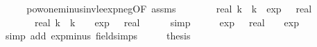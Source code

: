 \begin{isabellebody}
%
\isadelimproof
%
\endisadelimproof
%
\isatagproof
{}\isamarkupfalse%
\ {\isacharminus}{\kern0pt}\isanewline
\ \ \isamarkupfalse%
\ pow{\isacharunderscore}{\kern0pt}one{\isacharunderscore}{\kern0pt}minus{\isacharunderscore}{\kern0pt}inv{\isacharunderscore}{\kern0pt}le{\isacharunderscore}{\kern0pt}exp{\isacharunderscore}{\kern0pt}neg{}{\isacharbrackleft}{\kern0pt}OF\ assms{\isacharbrackright}{\kern0pt}\isanewline
\ \ \isamarkupfalse%
\ {\isachardoublequoteopen}{\isacharparenleft}{\kern0pt}{}\ {\isacharminus}{\kern0pt}\ {}\ {\isacharslash}{\kern0pt}\ real\ k{\isacharparenright}{\kern0pt}\ {\isacharcircum}{\kern0pt}\ k\ {\isasymle}\ exp\ {\isacharparenleft}{\kern0pt}{\isacharminus}{\kern0pt}{}\ {\isacharcolon}{\kern0pt}{\isacharcolon}{\kern0pt}\ real{\isacharparenright}{\kern0pt}{\isachardoublequoteclose}\ \isakeywordONE{{\isachardot}{\kern0pt}}\isamarkupfalse%
\isanewline
\ \ \isamarkupfalse%
\ \isamarkupfalse%
\ {\isachardoublequoteopen}{}\ {\isacharminus}{\kern0pt}\ {\isacharparenleft}{\kern0pt}{}\ {\isacharminus}{\kern0pt}\ {}\ {\isacharslash}{\kern0pt}\ real\ k{\isacharparenright}{\kern0pt}\ {\isacharcircum}{\kern0pt}\ k\ {\isasymge}\ {}\ {\isacharminus}{\kern0pt}\ exp\ {\isacharparenleft}{\kern0pt}{\isacharminus}{\kern0pt}{}\ {\isacharcolon}{\kern0pt}{\isacharcolon}{\kern0pt}\ real{\isacharparenright}{\kern0pt}{\isachardoublequoteclose}\isanewline
\ \ \ \ \isamarkupfalse%
\ simp\isanewline
\ \ \isamarkupfalse%
\ \isamarkupfalse%
\ {\isachardoublequoteopen}exp\ {\isacharparenleft}{\kern0pt}{\isacharminus}{\kern0pt}{}\ {\isacharcolon}{\kern0pt}{\isacharcolon}{\kern0pt}\ real{\isacharparenright}{\kern0pt}\ {\isacharequal}{\kern0pt}\ {}\ {\isacharslash}{\kern0pt}\ exp\ {}{\isachardoublequoteclose}\isanewline
\ \ \ \ \isamarkupfalse%
\ {\isacharparenleft}{\kern0pt}simp\ add{\isacharcolon}{\kern0pt}\ exp{\isacharunderscore}{\kern0pt}minus\ field{\isacharunderscore}{\kern0pt}simps{\isacharparenright}{\kern0pt}\isanewline
\ \ \isamarkupfalse%
\ \isamarkupfalse%
\ {\isacharquery}{\kern0pt}thesis\ \isakeywordONE{{\isachardot}{\kern0pt}}\isamarkupfalse%
\isanewline
{}\isamarkupfalse%
%
\endisatagproof
{\isafoldproof}%
%
\isadelimproof
\isanewline
%
\endisadelimproof
\isanewline
\isanewline

\end{isabellebody}
